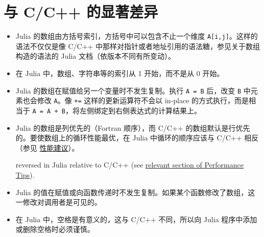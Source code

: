 \hypertarget{17929505884596702354}{}


\section{与 C/C++ 的显著差异}



\begin{itemize}
\item Julia 的数组由方括号索引，方括号中可以包含不止一个维度 \texttt{A[i,j]}。这样的语法不仅仅是像 C/C++ 中那样对指针或者地址引用的语法糖，参见关于数组构造的语法的 Julia 文档（依版本不同有所变动）。


\item 在 Julia 中，数组、字符串等的索引从 1 开始，而不是从 0 开始。


\item Julia 的数组在赋值给另一个变量时不发生复制。执行 \texttt{A = B} 后，改变 \texttt{B} 中元素也会修改 \texttt{A}。像 \texttt{+=} 这样的更新运算符不会以 in-place 的方式执行，而是相当于 \texttt{A = A + B}，将左侧绑定到右侧表达式的计算结果上。


\item Julia 的数组是列优先的（Fortran 顺序），而 C/C++ 的数组默认是行优先的。要使数组上的循环性能最优，在 Julia 中循环的顺序应该与 C/C++ 相反（参见 \hyperlink{818954303942149020}{性能建议}）。

reversed in Julia relative to C/C++ (see \hyperlink{11239800376478112527}{relevant section of Performance Tips}).


\item Julia 的值在赋值或向函数传递时不发生复制。如果某个函数修改了数组，这一修改对调用者是可见的。


\item 在 Julia 中，空格是有意义的，这与 C/C++ 不同，所以向 Julia 程序中添加或删除空格时必须谨慎。



\end{itemize}
